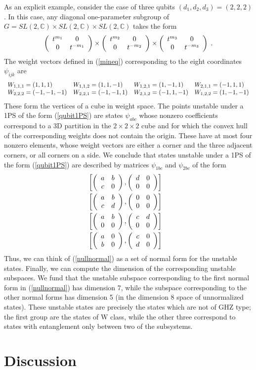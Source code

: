 \documentclass[12pt]{article}
\theoremstyle{definition}
\newcommand{\be}{\begin{equation}}
\newcommand{\ee}{\end{equation}}
\newcommand{\bea}{\begin{eqnarray}}
\newcommand{\eea}{\end{eqnarray}}
\newcommand{\ba}{\begin{array}}
\newcommand{\ea}{\end{array}}
\begin{document}
As an explicit example, consider the case of three qubits $(d_1,d_2,d_3) = (2,2,2)$. In this case, any diagonal one-parameter subgroup of $G = SL(2, \mathbb{C}) \times SL(2, \mathbb{C}) \times SL(2, \mathbb{C})$ takes the form
\be
\label{qubit1PS}
\left( \ba{cc} t^{m_1} & 0 \cr 0 & t^{-m_1} \ea \right) \times \left( \ba{cc} t^{m_2} & 0 \cr 0 & t^{-m_2} \ea \right) \times \left( \ba{cc} t^{m_3} & 0 \cr 0 & t^{-m_3} \ea \right) \; .
\ee
The weight vectors defined in (\ref{mineq}) corresponding to the eight coordinates $\psi_{ijk}$  are
\be
\ba{llll} W_{1,1,1} = (1,1,1) & W_{1,1,2} = (1,1,-1) & W_{1,2,1} = (1,-1,1) & W_{2,1,1} = (-1,1,1) \cr
W_{2, 2, 2} = (-1,-1,-1) & W_{2,2,1} = (-1,-1,1) & W_{2,1,2} = (-1,1,-1) & W_{1,2,2} = (1,-1,-1) \ea
\ee
These form the vertices of a cube in weight space. The points unstable under a 1PS of the form (\ref{qubit1PS}) are states $\psi_{abc}$ whose nonzero coefficients correspond to a 3D partition in the $2 \times 2 \times 2$ cube and for which the convex hull of the corresponding weights does not contain the origin. These have at most four nonzero elements, whose weight vectors are either a corner and the three adjacent corners, or all corners on a side. We conclude that states unstable under a 1PS of the form (\ref{qubit1PS}) are described by matrices $\psi_{1bc}$ and $\psi_{2bc}$ of the form
\bea
\label{nullnormal}
&\left[\left( \ba{cc} a & b \cr c & 0 \ea \right) , \left( \ba{cc} d & 0 \cr 0 & 0 \ea \right)\right] \cr
&\left[\left( \ba{cc} a & b \cr c & d \ea \right) , \left( \ba{cc} 0 & 0 \cr 0 & 0 \ea \right)\right] \cr
&\left[\left( \ba{cc} a & b \cr 0 & 0 \ea \right) , \left( \ba{cc} c & d \cr 0 & 0 \ea \right)\right] \cr
&\left[\left( \ba{cc} a & 0 \cr b & 0 \ea \right) , \left( \ba{cc} c & 0 \cr d & 0 \ea \right)\right] \cr
\eea
Thus, we can think of (\ref{nullnormal}) as a set of normal form for the unstable states. Finally, we can compute the dimension of the corresponding unstable subspaces. We fund that the unstable subspace corresponding to the first normal form in (\ref{nullnormal}) has dimension 7, while the subspace corresponding to the other normal forms has dimension 5 (in the dimension 8 space of unnormalized states). These unstable states are precisely the states which are not of GHZ type; the first group are the states of W class, while the other three correspond to states with entanglement only between two of the subsystems.

\section{Discussion}
\end{document}
